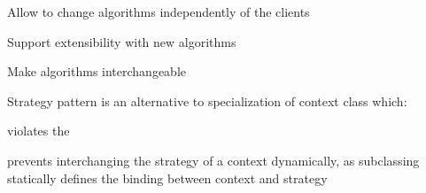 \begin{figure}[H]	
  \centering
    \resizebox{\linewidth}{!}{\tikzset{font=\Huge}}
\end{figure}
\begin{intentbox}[Intent]\nospacing
  \begin{itemizenosep}
      \item Allow to change algorithms independently of the clients
      \item Support extensibility with new algorithms
      \item Make algorithms interchangeable
  \end{itemizenosep}
\end{intentbox}
\begin{sectionbox}\nospacing
  \begin{minipage}[t]{0.45\textwidth}
  Strategy pattern is an alternative to specialization of context
  class which:
  \begin{itemizenosep}
      \item violates the 
      \item prevents interchanging the strategy of a context dynamically, as
    subclassing statically defines the binding between context and strategy
  \end{itemizenosep}
  \end{minipage}
  \begin{minipage}[t]{0.5\textwidth}
  \begin{figure}[H]
    \centering
    \vspace{-1em}
      \resizebox{\linewidth}{!}{}
  \end{figure}
  \end{minipage}
\end{sectionbox}
